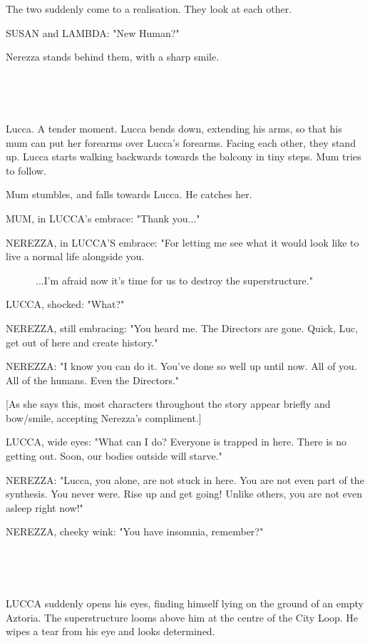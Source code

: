 \documentclass[11pt]{article}
\begin{document}
The two suddenly come to a realisation.
They look at each other.

SUSAN and LAMBDA: "New Human?"

Nerezza stands behind them, with a sharp smile.

\ 

\ 

Lucca.
A tender moment.
Lucca bends down, extending his arms, so that his mum can put her forearms over Lucca's forearms.
Facing each other, they stand up.
Lucca starts walking backwards towards the balcony in tiny steps.
Mum tries to follow.

Mum stumbles, and falls towards Lucca.
He catches her.

MUM, in LUCCA's embrace: "Thank you..."

NEREZZA, in LUCCA'S embrace: "For letting me see what it would look like to live a normal life alongside you.

\ \ \ \ \ \ ...I'm afraid now it's time for us to destroy the superstructure."

LUCCA, shocked: "What?"

NEREZZA, still embracing: "You heard me.
The Directors are gone.
Quick, Luc, get out of here and create history."

NEREZZA: "I know you can do it.
You've done so well up until now.
All of you.
All of the humans.
Even the Directors."

[As she says this, most characters throughout the story appear briefly and bow/smile, accepting Nerezza's compliment.]

LUCCA, wide eyes: "What can I do? 
Everyone is trapped in here. 
There is no getting out.
Soon, our bodies outside will starve."

NEREZZA: "Lucca, you alone, are not stuck in here. 
You are not even part of the synthesis.
You never were. 
Rise up and get going!
Unlike others, you are not even asleep right now!"

NEREZZA, cheeky wink: "You have insomnia, remember?"

\ 

\ 

LUCCA suddenly opens his eyes, finding himself lying on the ground of an empty Aztoria.
The superstructure looms above him at the centre of the City Loop.
He wipes a tear from his eye and looks determined.
\end{document}
